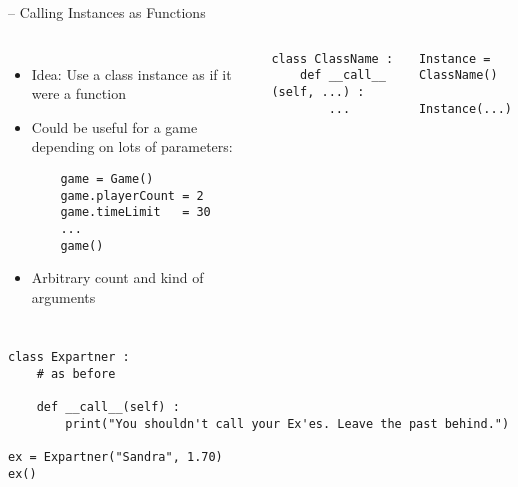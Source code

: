 
\begin{frame}[fragile]{ -- Calling Instances as Functions}
%
\vspace{-10pt}
\begin{columns}[t]
%
\begin{itemize}
\item Idea: Use a class instance as if it were a function
\item Could be useful for a game depending on lots of parameters:
	\begin{verbatim}
	game = Game()
	game.playerCount = 2
	game.timeLimit   = 30
	...
	game()
	\end{verbatim}
\item Arbitrary count and kind of arguments
\end{itemize}
%
\begin{codebox}
\begin{verbatim}
class ClassName :
    def __call__ (self, ...) :
        ...
\end{verbatim}
\end{codebox}
%
\begin{codebox}
\begin{verbatim}
Instance = ClassName()

Instance(...)
\end{verbatim}
\end{codebox}
\end{columns}
%
\end{frame}


\begin{frame}[fragile]
%
\begin{codebox}
\begin{verbatim}
class Expartner :
    # as before
    
    def __call__(self) :
        print("You shouldn't call your Ex'es. Leave the past behind.")

ex = Expartner("Sandra", 1.70)
ex()
\end{verbatim}
\end{codebox}
%
\end{frame}
